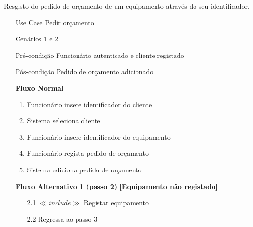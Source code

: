 \documentclass[../relatorio.tex]{subfiles}
\begin{document}
Resgisto do pedido de orçamento de um equipamento através do seu identificador.
\begin{itemize}
	\item[Use Case] {\underline{Pedir orçamento}}
	\item[Cenários] {1 e 2}
	\item[Pré-condição] {Funcionário autenticado e cliente registado}
	\item[Pós-condição] {Pedido de orçamento adicionado}
	      \begin{flushleft}
		      \textbf{Fluxo Normal}
	      \end{flushleft}
	      \begin{enumerate}
		      \item Funcionário insere identificador do cliente
              \item Sistema seleciona cliente
		      \item Funcionário insere identificador do equipamento
		      \item Funcionário regista pedido de orçamento
		      \item Sistema adiciona pedido de orçamento
	      \end{enumerate}

	      \begin{flushleft}
		      \textbf{Fluxo Alternativo 1 (passo 2) [Equipamento não registado]}
	      \end{flushleft}
	      \begin{itemize}
		      \item[2.1] $\ll include \gg$ Registar equipamento
		      \item[2.2] Regressa ao passo 3
	      \end{itemize}
\end{itemize}
\end{document}

